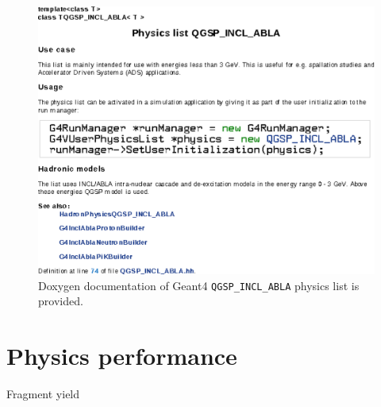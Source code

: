 \documentclass[a4paper]{jpconf}
\begin{document}
\begin{figure}[h]
\begin{center}
\includegraphics[scale=0.70]{poster/images/inclAblaDoc.eps}
\caption{\label{fig:doxygen}Doxygen documentation of Geant4 {\tt QGSP\_\-INCL\_ABLA} physics list is provided.}
\end{center}
\end{figure}


\section{Physics performance}\label{sec:performance}
Fragment yield
\end{document}
